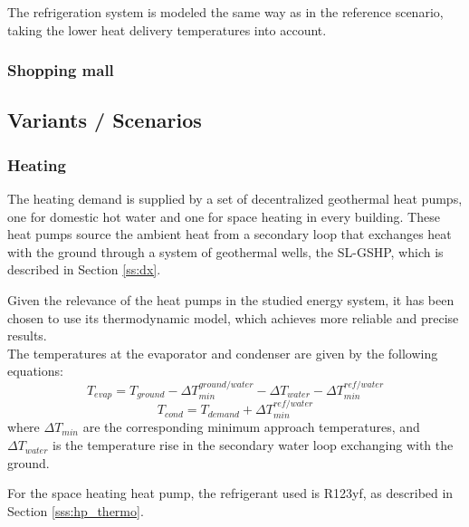 \documentclass{article}
\begin{document}

The refrigeration system is modeled the same way as in the reference scenario, taking the lower heat delivery temperatures into account.

\subsubsection{Shopping mall}

\subsection{Variants / Scenarios}

\subsubsection{Heating}
The heating demand is supplied by a set of decentralized geothermal heat pumps, one for domestic hot water and one for space heating in every building. These heat pumps source the ambient heat from a secondary loop that exchanges heat with the ground through a system of geothermal wells, the SL-GSHP, which is described in Section \ref{ss:dx}. 

Given the relevance of the heat pumps in the studied energy system, it has been chosen to use its thermodynamic model, which achieves more reliable and precise results.\\

The temperatures at the evaporator and condenser are given by the following equations:
\begin{equation}
T_{evap} = T_{ground} - \Delta T_{min}^{ground/water} - \Delta T_{water} - \Delta T_{min}^{ref/water}
\end{equation}
\begin{equation}
T_{cond} = T_{demand} + \Delta T_{min}^{ref/water}
\end{equation}
where $\Delta T_{min}$ are the corresponding minimum approach temperatures, and $\Delta T_{water}$ is the temperature rise in the secondary water loop exchanging with the ground.

For the space heating heat pump, the refrigerant used is R123yf, as described in Section \ref{sss:hp_thermo}.\\
\end{document}
